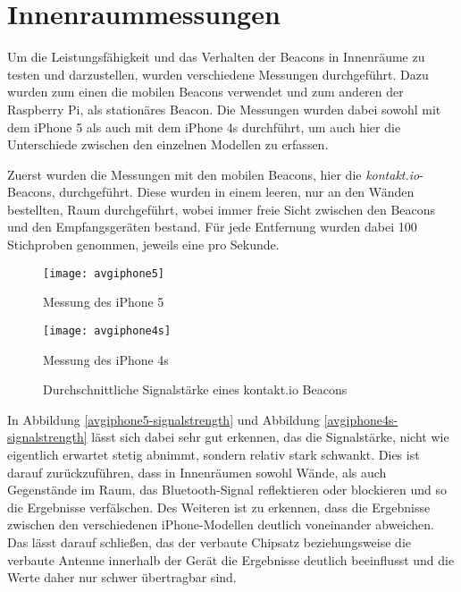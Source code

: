 \section{Innenraummessungen}
\label{sec:dataandmeasurement:indoormeasure}
Um die Leistungsfähigkeit und das Verhalten der Beacons in Innenräume zu testen und darzustellen, wurden verschiedene Messungen durchgeführt. Dazu wurden zum einen die mobilen Beacons verwendet und zum anderen der Raspberry Pi, als stationäres Beacon.
Die Messungen wurden dabei sowohl mit dem iPhone 5 als auch mit dem iPhone 4s durchführt, um auch hier die Unterschiede zwischen den einzelnen Modellen zu erfassen.


Zuerst wurden die Messungen mit den mobilen Beacons, hier die \emph{kontakt.io}-Beacons, durchgeführt.
Diese wurden in einem leeren, nur an den Wänden bestellten, Raum durchgeführt, wobei immer freie Sicht zwischen den Beacons und den Empfangsgeräten bestand. Für jede Entfernung wurden dabei 100 Stichproben genommen, jeweils eine pro Sekunde.
\begin{figure}[h!]
	\centering
	\begin{minipage}[t]{5cm}
		\texttt{[image: avgiphone5]}
		\caption{Messung des iPhone 5}
		\label{avgiphone5-signalstrength}
	\end{minipage}
	\hspace{2cm}
	\begin{minipage}[t]{5cm}
			\texttt{[image: avgiphone4s]}
			\caption{Messung des iPhone 4s}
			\label{avgiphone4s-signalstrength}
	\end{minipage}
		\caption{Durchschnittliche Signalstärke eines kontakt.io Beacons}
		\label{signalstrength}
\end{figure}

In Abbildung \ref{avgiphone5-signalstrength} und Abbildung \ref{avgiphone4s-signalstrength} lässt sich dabei sehr gut erkennen, das die Signalstärke, nicht wie eigentlich erwartet stetig abnimmt, sondern relativ stark schwankt. Dies ist darauf zurückzuführen, dass in Innenräumen sowohl Wände, als auch Gegenstände im Raum, das Bluetooth-Signal reflektieren oder blockieren und so die Ergebnisse verfälschen.
Des Weiteren ist zu erkennen, dass die Ergebnisse zwischen den verschiedenen iPhone-Modellen deutlich voneinander abweichen. Das lässt darauf schließen, das der verbaute Chipsatz beziehungsweise die verbaute Antenne innerhalb der Gerät die Ergebnisse deutlich beeinflusst und die Werte daher nur schwer übertragbar sind.



